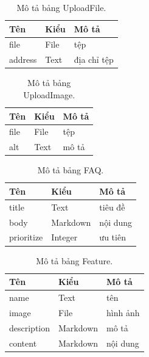 \documentclass[11pt]{report}
\begin{document}
		
	\begin{table}[h!]
		\begin{center}
			\caption{Mô tả bảng UploadFile.}
			\begin{tabularx}{0.6\textwidth}{ |l|l|X| } 
				\hline
				Tên & Kiểu & Mô tả \\
				\hline
				file & File & tệp \\
				address & Text & địa chỉ tệp\\ 
				\hline
			\end{tabularx}
			\label{table:UploadFile}
		\end{center}
	\end{table}
	
		\clearpage
	\begin{table}[h!]
		\begin{center}
			\caption{Mô tả bảng UploadImage.}
			\begin{tabularx}{0.6\textwidth}{ |l|l|X| } 
				\hline
				Tên & Kiểu & Mô tả \\
				\hline
				file & File & tệp \\
				alt & Text & mô tả \\ 
				\hline
			\end{tabularx}
			\label{table:UploadImage}
		\end{center}
	\end{table}
	
	
	\begin{table}[h!]
		\begin{center}
			\caption{Mô tả bảng FAQ.}
			\begin{tabularx}{0.6\textwidth}{ |l|l|X| } 
				\hline
				Tên & Kiểu & Mô tả \\
				\hline
				title & Text & tiêu đề \\
				body & Markdown & nội dung \\
				prioritize & Integer & ưu tiên \\ 
				\hline
			\end{tabularx}
			\label{table:FAQ}
		\end{center}
	\end{table}
	

	\begin{table}[h!]
		\begin{center}
			\caption{Mô tả bảng Feature.}
			\begin{tabularx}{0.6\textwidth}{ |l|l|X| } 
				\hline
				Tên & Kiểu & Mô tả \\
				\hline
				name & Text & tên \\
				image & File & hình ảnh \\
				description & Markdown & mô tả \\
				content & Markdown & nội dung \\ 
				\hline
			\end{tabularx}
			\label{table:Feature}
		\end{center}
	\end{table}
	
\end{document}
